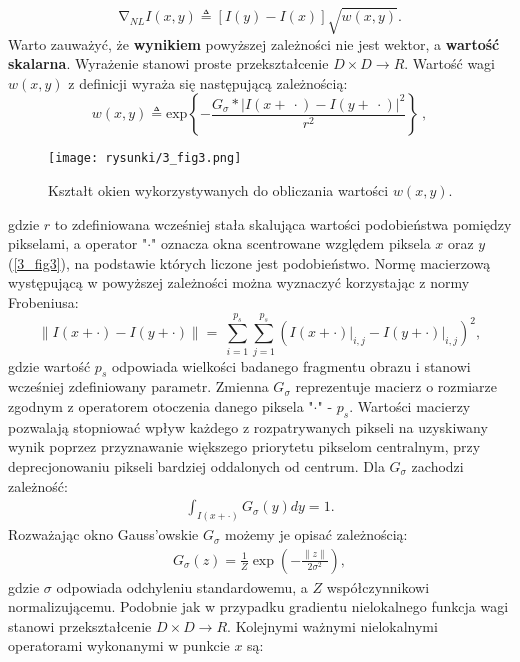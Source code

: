 \documentclass[12pt, twoside, openany]{report}
\theoremstyle{definition}
\begin{document}
\begin{equation}
{\mathrm{\nabla }}_{NL}I\left(x,y\right)\triangleq \left[I\left(y\right)-I\left(x\right)\right]\sqrt{w(x,y)}
\label{NLGRAD}
.
\end{equation}
Warto zauważyć, że \textbf{wynikiem} powyższej zależności nie jest wektor, a \textbf{wartość skalarna}. Wyrażenie stanowi proste przekształcenie $D \times D\longrightarrow R$. Wartość wagi $w(x,y)$ z definicji wyraża się następującą zależnością:
\begin{equation}
w\left(x,y\right)\triangleq {\mathrm{exp} \left\{-\frac{G_{\sigma }*{\left|I\left(x+\ \cdot \right)-I\left(y+\ \cdot \right)\right|}^2}{r^2}\right\}\ }
\label{NLWEIGHT}
,
\end{equation}
\begin{figure}[!h]
	\centering
	\texttt{[image: rysunki/3\_fig3.png]}
	\caption{Kształt okien wykorzystywanych do obliczania wartości $w(x,y)$.}
	\label{3_fig3}
\end{figure}
gdzie $r$ to zdefiniowana wcześniej stała skalująca wartości podobieństwa pomiędzy pikselami, a operator "$\cdot$" oznacza okna scentrowane względem piksela $x$ oraz $y$ (\autoref{3_fig3}), na podstawie których liczone jest podobieństwo. Normę macierzową występującą w powyższej zależności można wyznaczyć korzystając z normy Frobeniusa:
\begin{equation}
{\|I\left(x+\cdot \right)-I\left(y+\cdot \right)\|}=\ \sum^{p_s}_{i=1}{\sum^{p_s}_{j=1}{{\left(I(x+\cdot)\big|_{i,j}-I(y+\cdot)\big|_{i,j}\right)}^2}}
\label{FROBENIUS}
,
\end{equation}
gdzie wartość $p_s$ odpowiada wielkości badanego fragmentu obrazu i stanowi wcześniej zdefiniowany parametr. Zmienna $G_\sigma$ reprezentuje macierz o rozmiarze zgodnym z operatorem otoczenia danego piksela "$\cdot$" - $p_s$. Wartości macierzy pozwalają stopniować wpływ każdego z rozpatrywanych pikseli na uzyskiwany wynik poprzez przyznawanie większego priorytetu pikselom centralnym, przy deprecjonowaniu pikseli bardziej oddalonych od centrum. Dla $G_\sigma$ zachodzi zależność:
\begin{align}
\int_{I(x+\cdot)}G_{\sigma}(y)dy = 1.
\end{align}
Rozważając okno Gauss'owskie $G_\sigma$ możemy je opisać zależnością:
\begin{align}
G_\sigma(z)=\frac{1}{Z}\exp\left(-\frac{\|z\|}{2\sigma^2}\right),
\label{oknoGaussowskie}
\end{align}
gdzie $\sigma$ odpowiada odchyleniu standardowemu, a $Z$ współczynnikowi normalizującemu. Podobnie jak w przypadku gradientu nielokalnego funkcja wagi stanowi przekształcenie $D \times D\longrightarrow R$. Kolejnymi ważnymi nielokalnymi operatorami wykonanymi w punkcie $x$ są: 
\end{document}
